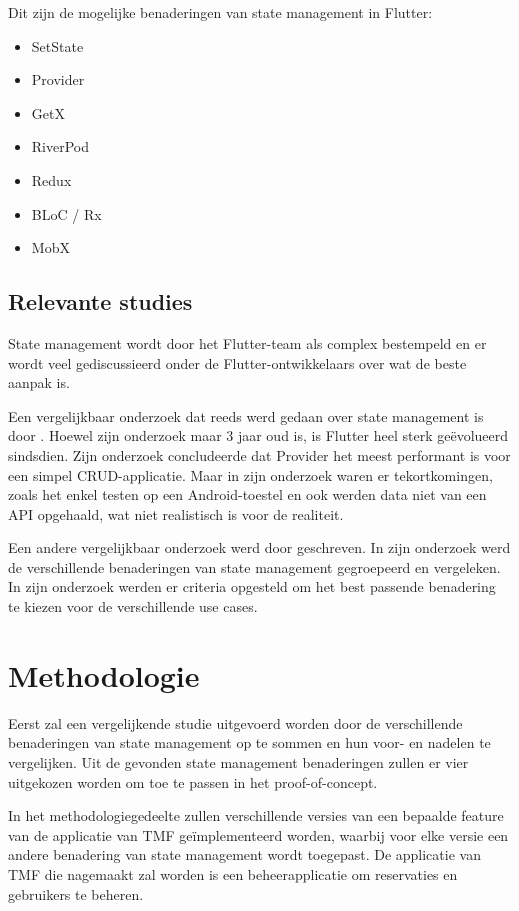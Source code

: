 Dit zijn de mogelijke benaderingen van state management in Flutter: 
\begin{itemize}
    \item SetState
    \item Provider
    \item GetX
    \item RiverPod
    \item Redux
    \item BLoC / Rx
    \item MobX
\end{itemize}

\subsection{Relevante studies}
State management wordt door het Flutter-team als complex bestempeld en er wordt veel gediscussieerd onder de Flutter-ontwikkelaars over wat de beste aanpak is.

Een vergelijkbaar onderzoek dat reeds werd gedaan over state management is door \textcite{Vriest2019}. Hoewel zijn onderzoek maar 3 jaar oud is, is Flutter heel sterk geëvolueerd sindsdien. Zijn onderzoek concludeerde dat Provider het meest performant is voor een simpel CRUD-applicatie. Maar in zijn onderzoek waren er tekortkomingen, zoals het enkel testen op een Android-toestel en ook werden data niet van een API opgehaald, wat niet realistisch is voor de realiteit.

 Een andere vergelijkbaar onderzoek werd door \textcite{slep2020} geschreven. In zijn onderzoek werd de verschillende benaderingen van state management gegroepeerd en vergeleken. In zijn onderzoek werden er criteria opgesteld om het best passende benadering te kiezen voor de verschillende use cases.


\section{Methodologie}%
\label{sec:methodologie}

Eerst zal een vergelijkende studie uitgevoerd worden door de verschillende benaderingen van state management op te sommen en hun voor- en nadelen te vergelijken. Uit de gevonden state management benaderingen zullen er vier uitgekozen worden om toe te passen in het proof-of-concept.


In het methodologiegedeelte zullen verschillende versies van een bepaalde feature van de applicatie van TMF geïmplementeerd worden, waarbij voor elke versie een andere benadering van state management wordt toegepast. De applicatie van TMF die nagemaakt zal worden is een beheerapplicatie om reservaties en gebruikers te beheren.

